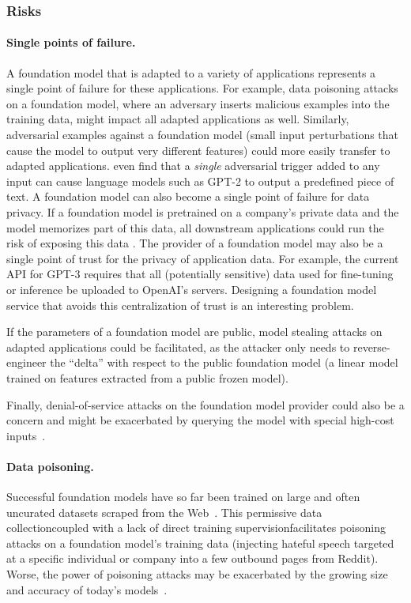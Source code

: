 \subsubsection{Risks}
\paragraph{Single points of failure.}
A foundation model that is adapted to a variety of applications represents a single point of failure for these applications. 
For example, data poisoning attacks on a foundation model, where an adversary inserts malicious examples into the training data, might impact all adapted applications as well. 
Similarly, adversarial examples against a foundation model (\ie small input perturbations that cause the model to output very different features) could more easily transfer to adapted applications. \citet{wallace2019universal} even find that a \emph{single} adversarial trigger added to any input can cause language models such as GPT-2 to output a predefined piece of text.
A foundation model can also become a single point of failure for data privacy.
If a foundation model is pretrained on a company's private data and the model memorizes part of this data, all downstream applications could run the risk of exposing this data \citep{carlini2020extracting}.
The provider of a foundation model may also be a single point of trust for the privacy of application data. For example, the current API for GPT-3 requires that all (potentially sensitive) data used for fine-tuning or inference be uploaded to OpenAI's servers. Designing a foundation model service that avoids this centralization of trust is an interesting problem.

If the parameters of a foundation model are public, model stealing attacks on adapted applications could be facilitated, as the attacker only needs to reverse-engineer the ``delta'' with respect to the public foundation model \citep{krishna2019thieves} (\eg a linear model trained on features extracted from a public frozen model).

Finally, denial-of-service attacks on the foundation model provider could also be a concern and might be exacerbated by querying the model with special high-cost inputs~\citep{shumailov2020sponge}.

\paragraph{Data poisoning.}
Successful foundation models have so far been trained on large and often uncurated datasets scraped from the 
Web~\citep{radford2021learning,radford2019language}. 
This permissive data collection\dash{}coupled with a lack of direct training supervision\dash{}facilitates poisoning attacks on a foundation model's training data (\eg injecting hateful speech targeted at a specific individual or company into a few outbound pages from Reddit).
Worse, the power of poisoning attacks may be exacerbated by the  growing size and accuracy of today's models~\citep{carlini2021poisoningssl}.


